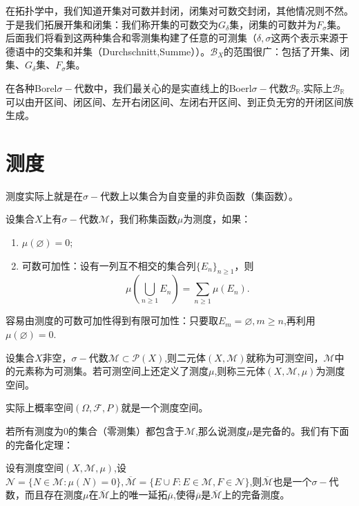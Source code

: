 \documentclass[lang=cn,10pt]{elegantbook}
\begin{document}
	在拓扑学中，我们知道开集对可数并封闭，闭集对可数交封闭，其他情况则不然。于是我们拓展开集和闭集：我们称开集的可数交为\(G_\delta\)集，闭集的可数并为\(F_\sigma\)集。后面我们将看到这两种集合和零测集构建了任意的可测集（\(\delta,\sigma\)这两个表示来源于德语中的交集和并集（Durchschnitt,Summe））。\(\mathcal{B}_X\)的范围很广：包括了开集、闭集、\(G_\delta\)集、\(F_\sigma\)集。

	在各种Borel\(\sigma-\)代数中，我们最关心的是实直线上的Boerl\(\sigma-\)代数\(\mathcal{B}_\mathbb{R}\).实际上\(\mathcal{B}_\mathbb{R}\)可以由开区间、闭区间、左开右闭区间、左闭右开区间、到正负无穷的开闭区间族生成。



	\section{测度}
	测度实际上就是在\(\sigma-\)代数上以集合为自变量的非负函数（集函数）。
	\begin{definition}[测度]
		设集合\(X\)上有\(\sigma-\)代数\(\mathcal{M}\)，我们称集函数\(\mu\)为测度，如果：
		\begin{enumerate}
			\item \(\mu(\varnothing)=0\);
			\item 可数可加性：设有一列互不相交的集合列\(\{E_n\}_{n\ge 1}\)，则
			\[\mu(\bigcup_{n\ge 1}E_n)=\sum_{n\ge 1}\mu(E_n).\]
		\end{enumerate}
	\end{definition}
	容易由测度的可数可加性得到有限可加性：只要取\(E_m=\varnothing,m\ge n\),再利用\(\mu(\varnothing)=0\).
	\begin{definition}[测度空间]
		设集合\(X\)非空，\(\sigma-\)代数\(\mathcal{M}\subset \mathcal{P}(X)\),则二元体\((X,\mathcal{M})\)就称为可测空间，\(\mathcal{M}\)中的元素称为可测集。若可测空间上还定义了测度\(\mu\),则称三元体\((X,\mathcal{M},\mu)\)为测度空间。
	\end{definition}
	\begin{note}
		实际上概率空间\((\Omega,\mathcal{F},P)\)就是一个测度空间。
	\end{note}
	若所有测度为0的集合（零测集）都包含于\(\mathcal{M}\),那么说测度\(\mu\)是完备的。我们有下面的完备化定理：
	\begin{theorem}[完备化]
		设有测度空间\((X,\mathcal{M},\mu)\),设\(\mathcal{N}=\{N\in\mathcal{M}:\mu(N)=0\},\overline{\mathcal{M}}=\{E\cup F:E\in \mathcal{M},F\in \mathcal{N}\}\),则\(\overline{\mathcal{M}}\)也是一个\(\sigma-\)代数，而且存在测度\(\mu\)在\(\overline{\mathcal{M}}\)上的唯一延拓\(\overline{\mu}\),使得\(\overline{\mu}\)是\(\overline{\mathcal{M}}\)上的完备测度。
	\end{theorem}
\end{document}
